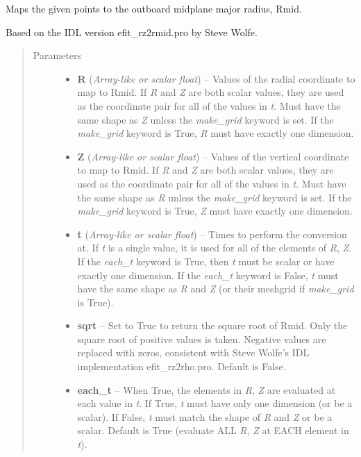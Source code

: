 \documentclass[letterpaper,10pt,english]{sphinxmanual}
\begin{document}
\begin{fulllineitems}
\begin{fulllineitems}
\label{eqtools:eqtools.core.Equilibrium.rz2rmid}
Maps the given points to the outboard midplane major radius, Rmid.

Based on the IDL version efit\_rz2rmid.pro by Steve Wolfe.
\begin{quote}\begin{description}
\item[{Parameters}] \leavevmode\begin{itemize}
\item {} 
\textbf{R} (\emph{Array-like or scalar float}) -- Values of the radial coordinate to
map to Rmid. If \emph{R} and \emph{Z} are both scalar values,
they are used as the coordinate pair for all of the values in
\emph{t}. Must have the same shape as \emph{Z} unless the \emph{make\_grid}
keyword is set. If the \emph{make\_grid} keyword is True, \emph{R} must
have exactly one dimension.

\item {} 
\textbf{Z} (\emph{Array-like or scalar float}) -- Values of the vertical coordinate to
map to Rmid. If \emph{R} and \emph{Z} are both scalar values,
they are used as the coordinate pair for all of the values in
\emph{t}. Must have the same shape as \emph{R} unless the \emph{make\_grid}
keyword is set. If the \emph{make\_grid} keyword is True, \emph{Z} must
have exactly one dimension.

\item {} 
\textbf{t} (\emph{Array-like or scalar float}) -- Times to perform the conversion at.
If \emph{t} is a single value, it is used for all of the elements of
\emph{R}, \emph{Z}. If the \emph{each\_t} keyword is True, then \emph{t} must be
scalar or have exactly one dimension. If the \emph{each\_t} keyword is
False, \emph{t} must have the same shape as \emph{R} and \emph{Z} (or their
meshgrid if \emph{make\_grid} is True).

\item {} 
\textbf{sqrt} -- Set to True to return the square root of Rmid.
Only the square root of positive values is taken. Negative
values are replaced with zeros, consistent with Steve Wolfe's
IDL implementation efit\_rz2rho.pro. Default is False.

\item {} 
\textbf{each\_t} -- When True, the elements in \emph{R}, \emph{Z} are evaluated
at each value in \emph{t}. If True, \emph{t} must have only one dimension
(or be a scalar). If False, \emph{t} must match the shape of \emph{R} and
\emph{Z} or be a scalar. Default is True (evaluate ALL \emph{R}, \emph{Z} at
EACH element in \emph{t}).


\end{itemize}
\end{description}
\end{quote}
\end{fulllineitems}
\end{fulllineitems}
\end{document}
